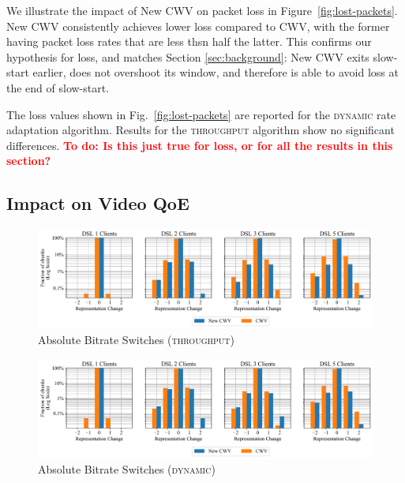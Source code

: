 \documentclass[10pt,sigconf]{acmart}
\newcommand{\todo}[1]{\textbf{\textcolor{red}{To do: #1}}}
\begin{document}
We illustrate the impact of New CWV on packet loss in Figure~\ref{fig:lost-packets}. New CWV consistently achieves lower loss compared to CWV, with the former having packet loss rates that are less thsn half the latter. This confirms our hypothesis for loss, and matches Section \ref{sec:background}: New CWV exits slow-start earlier, does not overshoot its window, and therefore is able to avoid loss at the end of slow-start.

The loss values shown in Fig.\ \ref{fig:lost-packets} are reported for the \textsc{dynamic} rate adaptation algorithm. Results for the \textsc{throughput} algorithm show no significant differences.
\todo{Is this just true for loss, or for all the results in this section?}

\subsection{Impact on Video QoE}
\label{sec:QoE-impact}

\begin{figure}
  \centering
  \includegraphics[width=\textwidth, keepaspectratio]{figures/bitrate_derivative_distribution.pdf}
  \caption{Absolute Bitrate Switches (\textsc{throughput})}
  \label{fig:bitrate-switches}
\end{figure}

\begin{figure}
  \centering
  \includegraphics[width=\textwidth, keepaspectratio]{figures/bitrate_derivative_distribution_dynamic.pdf}
  \caption{Absolute Bitrate Switches (\textsc{dynamic})}
  \label{fig:bitrate-switches-dynamic}
\end{figure}
\end{document}
